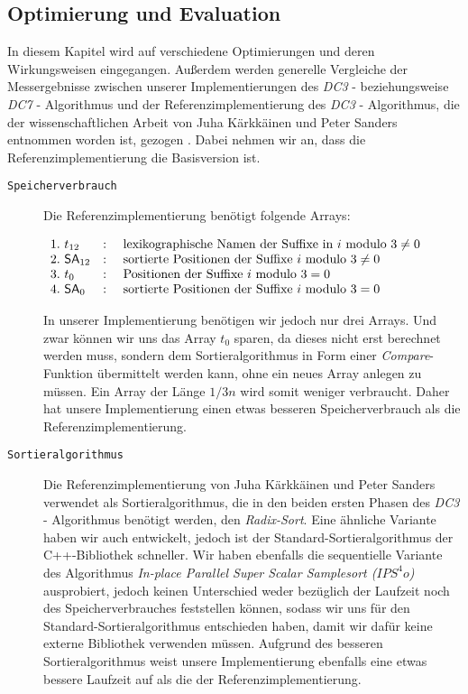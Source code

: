 \subsection{Optimierung und Evaluation}
\label{dc3:optim}

In  diesem Kapitel wird auf verschiedene Optimierungen und deren Wir\-kungs\-wei\-sen eingegangen. Außerdem werden generelle Vergleiche der Mess\-er\-geb\-nis\-se zwischen unserer Implementierungen des \emph{DC3} - beziehungsweise \emph{DC7} - Algorithmus und der Referenzimplementierung des \emph{DC3} - Algorithmus, die der wissenschaftlichen Arbeit von Juha Kärkkäinen und Peter Sanders entnommen worden ist, gezogen \cite[p.~954,955]{saca:9}. Dabei nehmen wir an, dass die Referenzimplementierung die Basisversion ist.

\begin{description}
	\item[\texttt{Speicherverbrauch}]

	Die Referenzimplementierung benötigt folgende Arrays:

	$\begin{array}{lcl}
	1. \text{  } t_{12} & : & \text{ lexikographische Namen der Suffixe in } 	i \text{ modulo } 3 \neq 0\\
	2. \text{  } \sa_{12}& : & \text{ sortierte Positionen der Suffixe } 		i \text{ modulo } 3 \neq 0\\
	3. \text{  } t_0	& : & \text{ Positionen der Suffixe } 					i \text{ modulo } 3 = 0\\
	4. \text{  } \sa_0	& : & \text{ sortierte Positionen der Suffixe } 		i \text{ modulo } 3 = 0
	\end{array}$

	In unserer Implementierung benötigen wir jedoch nur drei Arrays. Und zwar können wir uns das Array $t_{0}$ sparen, da dieses nicht erst berechnet werden muss, sondern dem Sortieralgorithmus in Form einer \emph{Compare}-Funktion übermittelt werden kann, ohne ein neues Array anlegen zu müssen. Ein Array der Länge $1/3n$ wird somit weniger verbraucht. Daher hat unsere Implementierung einen etwas besseren Speicherverbrauch als die Referenzimplementierung.

	\item[\texttt{Sortieralgorithmus}]

	Die Referenzimplementierung von Juha Kärkkäinen und Peter Sanders verwendet als Sortieralgorithmus, die in den beiden ersten Phasen des \emph{DC3} - Algorithmus benötigt werden, den \emph{Radix-Sort}. Eine ähnliche Variante haben wir auch entwickelt, jedoch ist der Standard-Sortieralgorithmus der C++-Bibliothek schneller. Wir haben ebenfalls die sequentielle Variante des Algorithmus \emph{In-place Parallel Super Scalar Samplesort ($IPS^4o$)} ausprobiert, jedoch keinen Unterschied weder bezüglich der Laufzeit noch des Speicherverbrauches feststellen können, sodass wir uns für den Standard-Sortieralgorithmus entschieden haben, damit wir dafür keine externe Bibliothek verwenden müssen. Aufgrund des besseren Sortieralgorithmus weist unsere Implementierung ebenfalls eine etwas bessere Laufzeit auf als die der Referenzimplementierung.


\end{description}
